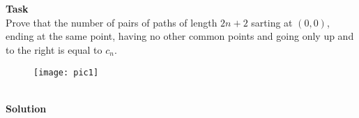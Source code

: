 \newpage		
	\section*{}
	\textbf{Task}\\
	Prove that the number of pairs of paths of length $2n+2$ sarting at $(0,0)$, ending at the same point, having no other common points and going only up and to the right is equal to $c_n$.\\
	\begin{figure}[h]
		\texttt{[image: pic1]}
	\end{figure}
	\\
	\textbf{Solution}\\